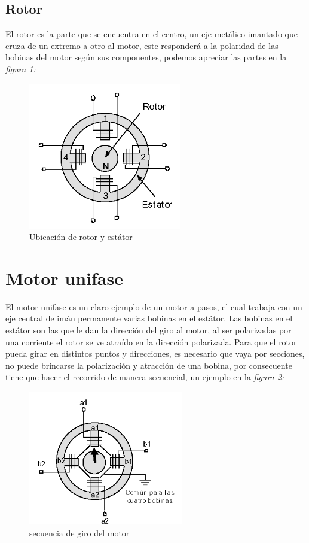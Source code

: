 \documentclass[11pt,a4paper]{article}
\begin{document}
\subsection{Rotor}

El rotor es la parte que se encuentra en el centro, un eje metálico imantado que cruza de un extremo a otro al motor, este responderá  a la polaridad de las bobinas del motor según sus componentes, podemos apreciar las partes en la \emph{figura 1:}

\begin{figure}[h]
\begin{center}
\includegraphics[scale=0.5]{2.png}
\caption{Ubicación de rotor y estátor}
\end{center}
\end{figure}

\section{Motor unifase}

El motor unifase es un claro ejemplo de un motor a pasos, el cual trabaja con un eje central de imán permanente varias bobinas en el estátor. Las bobinas en el estátor son las que le dan la dirección del giro al motor, al ser polarizadas por una corriente el rotor se ve atraído en la dirección polarizada. Para que el rotor pueda girar en distintos puntos y direcciones, es necesario que vaya por secciones, no puede brincarse la polarización y atracción de una bobina, por consecuente tiene que hacer el recorrido de manera secuencial, un ejemplo en la \emph{figura 2:}

\begin{figure}[h]
\begin{center}
\includegraphics[scale=0.6]{3.png}
\caption{secuencia de giro del motor}
\end{center}
\end{figure}
\end{document}
